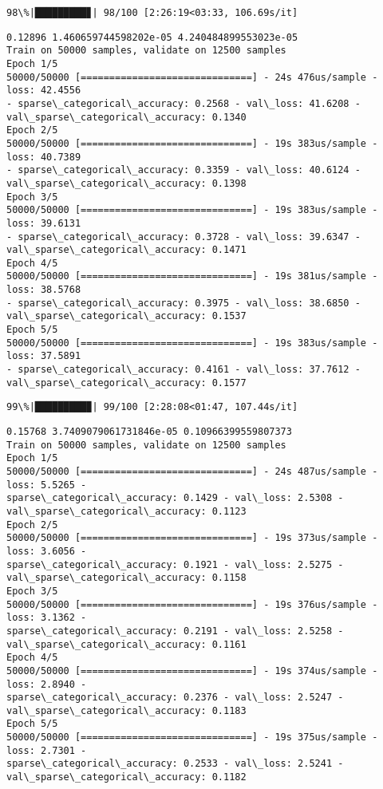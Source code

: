 \documentclass[11pt]{article}
\begin{document}
    \begin{Verbatim}[commandchars=\\\{\}]
 98\%|█████████▊| 98/100 [2:26:19<03:33, 106.69s/it]
    \end{Verbatim}

    \begin{Verbatim}[commandchars=\\\{\}]
0.12896 1.460659744598202e-05 4.240484899553023e-05
Train on 50000 samples, validate on 12500 samples
Epoch 1/5
50000/50000 [==============================] - 24s 476us/sample - loss: 42.4556
- sparse\_categorical\_accuracy: 0.2568 - val\_loss: 41.6208 -
val\_sparse\_categorical\_accuracy: 0.1340
Epoch 2/5
50000/50000 [==============================] - 19s 383us/sample - loss: 40.7389
- sparse\_categorical\_accuracy: 0.3359 - val\_loss: 40.6124 -
val\_sparse\_categorical\_accuracy: 0.1398
Epoch 3/5
50000/50000 [==============================] - 19s 383us/sample - loss: 39.6131
- sparse\_categorical\_accuracy: 0.3728 - val\_loss: 39.6347 -
val\_sparse\_categorical\_accuracy: 0.1471
Epoch 4/5
50000/50000 [==============================] - 19s 381us/sample - loss: 38.5768
- sparse\_categorical\_accuracy: 0.3975 - val\_loss: 38.6850 -
val\_sparse\_categorical\_accuracy: 0.1537
Epoch 5/5
50000/50000 [==============================] - 19s 383us/sample - loss: 37.5891
- sparse\_categorical\_accuracy: 0.4161 - val\_loss: 37.7612 -
val\_sparse\_categorical\_accuracy: 0.1577
    \end{Verbatim}

    \begin{Verbatim}[commandchars=\\\{\}]
 99\%|█████████▉| 99/100 [2:28:08<01:47, 107.44s/it]
    \end{Verbatim}

    \begin{Verbatim}[commandchars=\\\{\}]
0.15768 3.7409079061731846e-05 0.10966399559807373
Train on 50000 samples, validate on 12500 samples
Epoch 1/5
50000/50000 [==============================] - 24s 487us/sample - loss: 5.5265 -
sparse\_categorical\_accuracy: 0.1429 - val\_loss: 2.5308 -
val\_sparse\_categorical\_accuracy: 0.1123
Epoch 2/5
50000/50000 [==============================] - 19s 373us/sample - loss: 3.6056 -
sparse\_categorical\_accuracy: 0.1921 - val\_loss: 2.5275 -
val\_sparse\_categorical\_accuracy: 0.1158
Epoch 3/5
50000/50000 [==============================] - 19s 376us/sample - loss: 3.1362 -
sparse\_categorical\_accuracy: 0.2191 - val\_loss: 2.5258 -
val\_sparse\_categorical\_accuracy: 0.1161
Epoch 4/5
50000/50000 [==============================] - 19s 374us/sample - loss: 2.8940 -
sparse\_categorical\_accuracy: 0.2376 - val\_loss: 2.5247 -
val\_sparse\_categorical\_accuracy: 0.1183
Epoch 5/5
50000/50000 [==============================] - 19s 375us/sample - loss: 2.7301 -
sparse\_categorical\_accuracy: 0.2533 - val\_loss: 2.5241 -
val\_sparse\_categorical\_accuracy: 0.1182
    \end{Verbatim}
\end{document}
